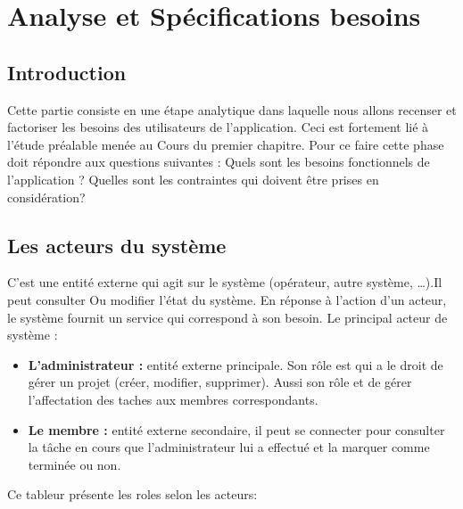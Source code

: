 \chapter{ Analyse et Sp\'{e}cifications besoins }
\section{Introduction}


Cette partie consiste en une \'{e}tape analytique dans laquelle nous allons
recenser et factoriser les besoins des utilisateurs de l'application. Ceci est
fortement li\'{e} \`{a} l'\'{e}tude pr\'{e}alable men\'{e}e au
Cours du premier chapitre.
Pour ce faire cette phase doit r\'{e}pondre aux questions suivantes :
Quels sont les besoins fonctionnels de l'application ?
Quelles sont les contraintes qui doivent \^{e}tre prises en consid\'{e}ration?

   \section{ Les acteurs du syst\`{e}me }
C'est une entit\'{e} externe qui agit sur le syst\`{e}me (op\'{e}rateur, autre syst\`{e}me,
\ldots{}).Il peut consulter
Ou modifier l'\'{e}tat du syst\`{e}me.
En r\'{e}ponse \`{a} l'action d'un acteur, le syst\`{e}me fournit un service qui
correspond \`{a} son besoin.
Le principal acteur de syst\`{e}me :
\begin{itemize}
\item{  \textbf{L'administrateur :} entit\'{e} externe principale. Son r\^{o}le est qui a le droit de
g\'{e}rer un projet (cr\'{e}er, modifier, supprimer).
Aussi son r\^{o}le et de g\'{e}rer l'affectation des taches aux membres
correspondants.
}

\item{ \textbf{Le membre : } entit\'{e} externe secondaire, il peut se connecter pour consulter la
t\^{a}che en cours que l'administrateur lui a effectu\'{e} et la marquer comme
termin\'{e}e ou non.
}
\end{itemize}

Ce tableur pr\'{e}sente les roles selon les acteurs:

